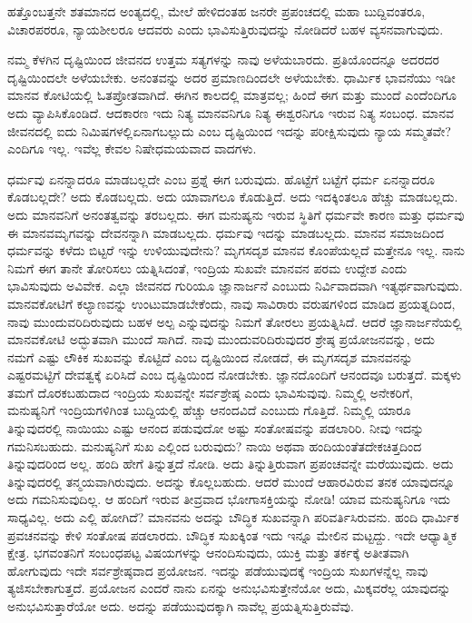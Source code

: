 ಹತ್ತೊಂಬತ್ತನೇ ಶತಮಾನದ ಅಂತ್ಯದಲ್ಲಿ, ಮೇಲೆ ಹೇಳಿದಂತಹ ಜನರೇ ಪ್ರಪಂಚದಲ್ಲಿ ಮಹಾ ಬುದ್ದಿವಂತರೂ, ವಿಚಾರಪರರೂ, ನ್ಯಾಯಶೀಲರೂ ಆದವರು ಎಂದು ಭಾವಿಸುತ್ತಿರುವುದನ್ನು ನೋಡಿದರೆ ಬಹಳ ವ್ಯಸನವಾಗುವುದು.

ನಮ್ಮ ಕೆಳಗಿನ ದೃಷ್ಟಿಯಿಂದ ಜೀವನದ ಉತ್ತಮ ಸತ್ಯಗಳನ್ನು ನಾವು ಅಳೆಯಬಾರದು. ಪ್ರತಿಯೊಂದನ್ನೂ ಅದರದರ ದೃಷ್ಟಿಯಿಂದಲೇ ಅಳೆಯಬೇಕು. ಅನಂತವನ್ನು ಅದರ ಪ್ರಮಾಣದಿಂದಲೇ ಅಳೆಯಬೇಕು. ಧಾರ್ಮಿಕ ಭಾವನೆಯು ಇಡೀ ಮಾನವ ಕೋಟಿಯಲ್ಲಿ ಓತಪ್ರೋತವಾಗಿದೆ. ಈಗಿನ ಕಾಲದಲ್ಲಿ ಮಾತ್ರವಲ್ಲ; ಹಿಂದೆ ಈಗ ಮತ್ತು ಮುಂದೆ ಎಂದೆಂದಿಗೂ ಅದು ವ್ಯಾಪಿಸಿಕೊಂಡಿದೆ. ಆದಕಾರಣ ಇದು ನಿತ್ಯ ಮಾನವನಿಗೂ ನಿತ್ಯ ಈಶ್ವರನಿಗೂ ಇರುವ ನಿತ್ಯ ಸಂಬಂಧ. ಮಾನವ ಜೀವನದಲ್ಲಿ ಐದು ನಿಮಿಷಗಳಲ್ಲಿ\break ಏನಾಗಬಲ್ಲುದು ಎಂಬ ದೃಷ್ಟಿಯಿಂದ ಇದನ್ನು ಪರೀಕ್ಷಿಸುವುದು ನ್ಯಾಯ ಸಮ್ಮತವೇ? ಎಂದಿಗೂ ಇಲ್ಲ. ಇವೆಲ್ಲ ಕೇವಲ ನಿಷೇಧಮಯವಾದ ವಾದಗಳು.

ಧರ್ಮವು ಏನನ್ನಾದರೂ ಮಾಡಬಲ್ಲದೇ ಎಂಬ ಪ್ರಶ್ನೆ ಈಗ ಬರುವುದು. ಹೊಟ್ಟೆಗೆ ಬಟ್ಟೆಗೆ ಧರ್ಮ ಏನನ್ನಾದರೂ ಕೊಡಬಲ್ಲದೇ? ಅದು ಕೊಡಬಲ್ಲದು. ಅದು ಯಾವಾಗಲೂ ಕೊಡುತ್ತಿದೆ. ಅದು ಇದಕ್ಕಿಂತಲೂ ಹೆಚ್ಚು ಮಾಡಬಲ್ಲದು. ಅದು ಮಾನವನಿಗೆ ಅನಂತತ್ವವನ್ನು ತರಬಲ್ಲದು. ಈಗ ಮನುಷ್ಯನು ಇರುವ ಸ್ಥಿತಿಗೆ ಧರ್ಮವೇ ಕಾರಣ ಮತ್ತು ಧರ್ಮವು ಈ ಮಾನವಮೃಗವನ್ನು ದೇವನನ್ನಾಗಿ ಮಾಡಬಲ್ಲದು. ಧರ್ಮವು ಇದನ್ನು ಮಾಡಬಲ್ಲದು. ಮಾನವ ಸಮಾಜದಿಂದ ಧರ್ಮವನ್ನು ಕಳೆದು ಬಿಟ್ಟರೆ ಇನ್ನು ಉಳಿಯುವುದೇನು? ಮೃಗಸದೃಶ ಮಾನವ ಕೊಂಪೆಯಲ್ಲದೆ ಮತ್ತೇನೂ ಇಲ್ಲ. ನಾನು ನಿಮಗೆ ಈಗ ತಾನೇ ತೋರಿಸಲು ಯತ್ನಿಸಿದಂತೆ, ಇಂದ್ರಿಯ ಸುಖವೇ ಮಾನವನ ಪರಮ ಉದ್ದೇಶ ಎಂದು ಭಾವಿಸುವುದು ಅವಿವೇಕ. ಎಲ್ಲಾ ಜೀವನದ ಗುರಿಯೂ ಜ್ಞಾನಾರ್ಜನೆ ಎಂಬುದು ನಿರ್ವಿವಾದವಾಗಿ ಇತ್ಯರ್ಥವಾಗುವುದು. ಮಾನವಕೋಟಿಗೆ ಕಲ್ಯಾಣವನ್ನು ಉಂಟುಮಾಡಬೇಕೆಂದು, ನಾವು ಸಾವಿರಾರು ವರುಷಗಳಿಂದ ಮಾಡಿದ ಪ್ರಯತ್ನದಿಂದ, ನಾವು ಮುಂದುವರಿದಿರುವುದು ಬಹಳ ಅಲ್ಪ ಎನ್ನುವುದನ್ನು ನಿಮಗೆ ತೋರಲು ಪ್ರಯತ್ನಿಸಿದೆ. ಆದರೆ ಜ್ಞಾನಾರ್ಜನೆಯಲ್ಲಿ ಮಾನವಕೋಟಿ ಅದ್ಭುತವಾಗಿ ಮುಂದೆ ಸಾಗಿದೆ. ನಾವು ಮುಂದುವರಿದಿರುವುದರ ಶ್ರೇಷ್ಠ ಪ್ರಯೋಜನವನ್ನು, ಅದು ನಮಗೆ ಎಷ್ಟು ಲೌಕಿಕ ಸುಖವನ್ನು ಕೊಟ್ಟಿದೆ ಎಂಬ ದೃಷ್ಟಿಯಿಂದ ನೋಡದೆ, ಈ ಮೃಗಸದೃಶ ಮಾನವನನ್ನು ಎಷ್ಟರಮಟ್ಟಿಗೆ ದೇವತ್ವಕ್ಕೆ ಏರಿಸಿದೆ ಎಂಬ ದೃಷ್ಟಿಯಿಂದ ನೋಡಬೇಕು. ಜ್ಞಾನದೊಂದಿಗೆ ಆನಂದವೂ ಬರುತ್ತದೆ. ಮಕ್ಕಳು ತಮಗೆ ದೊರಕಬಹುದಾದ ಇಂದ್ರಿಯ ಸುಖವನ್ನೇ ಸರ್ವಶ್ರೇಷ್ಠ ಎಂದು ಭಾವಿಸುವುವು. ನಿಮ್ಮಲ್ಲಿ ಅನೇಕರಿಗೆ, ಮನುಷ್ಯನಿಗೆ ಇಂದ್ರಿಯಗಳಿಗಿಂತ ಬುದ್ದಿಯಲ್ಲಿ ಹೆಚ್ಚು ಆನಂದವಿದೆ ಎಂಬುದು ಗೊತ್ತಿದೆ. ನಿಮ್ಮಲ್ಲಿ ಯಾರೂ ತಿನ್ನುವುದರಲ್ಲಿ ನಾಯಿಯು ಎಷ್ಟು ಆನಂದ ಪಡುವುದೋ ಅಷ್ಟು ಸಂತೋಷವನ್ನು ಪಡಲಾರಿರಿ. ನೀವು ಇದನ್ನು ಗಮನಿಸಬಹುದು. ಮನುಷ್ಯನಿಗೆ ಸುಖ ಎಲ್ಲಿಂದ ಬರುವುದು? ನಾಯಿ ಅಥವಾ ಹಂದಿಯಂತೆ\break ತದೇಕಚಿತ್ತದಿಂದ ತಿನ್ನುವುದರಿಂದ ಅಲ್ಲ. ಹಂದಿ ಹೇಗೆ ತಿನ್ನುತ್ತದೆ ನೋಡಿ. ಅದು ತಿನ್ನುತ್ತಿರುವಾಗ ಪ್ರಪಂಚವನ್ನೇ ಮರೆಯುವುದು. ಅದು ತಿನ್ನುವುದರಲ್ಲಿ ತನ್ಮಯವಾಗಿರುವುದು. ಅದನ್ನು ಕೊಲ್ಲಬಹುದು. ಆದರೆ ಮುಂದೆ ಆಹಾರವಿರುವ ತನಕ ಯಾವುದನ್ನೂ ಅದು ಗಮನಿಸುವುದಿಲ್ಲ. ಆ ಹಂದಿಗೆ ಇರುವ ತೀವ್ರವಾದ ಭೋಗಾಸಕ್ತಿಯನ್ನು ನೋಡಿ! ಯಾವ ಮನುಷ್ಯನಿಗೂ ಇದು ಸಾಧ್ಯವಿಲ್ಲ. ಅದು ಎಲ್ಲಿ ಹೋಗಿದೆ? ಮಾನವನು ಅದನ್ನು ಬೌದ್ಧಿಕ ಸುಖವನ್ನಾಗಿ ಪರಿವರ್ತಿಸಿರುವನು. ಹಂದಿ ಧಾರ್ಮಿಕ ಪ್ರವಚನವನ್ನು ಕೇಳಿ ಸಂತೋಷ ಪಡಲಾರದು. ಬೌದ್ಧಿಕ ಸುಖಕ್ಕಿಂತ ಇದು ಇನ್ನೂ ಮೇಲಿನ ಮಟ್ಟದ್ದು. ಇದೇ ಆಧ್ಯಾತ್ಮಿಕ ಕ್ಷೇತ್ರ. ಭಗವಂತನಿಗೆ ಸಂಬಂಧಪಟ್ಟ ವಿಷಯಗಳನ್ನು ಆನಂದಿಸುವುದು, ಯುಕ್ತಿ ಮತ್ತು ತರ್ಕಕ್ಕೆ ಅತೀತವಾಗಿ ಹೋಗುವುದು ಇದೇ ಸರ್ವಶ್ರೇಷ್ಠವಾದ ಪ್ರಯೋಜನ. ಇದನ್ನು ಪಡೆಯುವುದಕ್ಕೆ ಇಂದ್ರಿಯ ಸುಖಗಳನ್ನೆಲ್ಲ ನಾವು ತ್ಯಜಿಸಬೇಕಾಗುತ್ತದೆ. ಪ್ರಯೋಜನ ಎಂದರೆ ನಾನು ಏನನ್ನು ಅನುಭವಿಸುತ್ತೇನೆಯೋ ಅದು, ಮಿಕ್ಕವರೆಲ್ಲ ಯಾವುದನ್ನು ಅನುಭವಿಸುತ್ತಾರೆಯೋ ಅದು. ಅದನ್ನು ಪಡೆಯುವುದಕ್ಕಾಗಿ ನಾವೆಲ್ಲ ಪ್ರಯತ್ನಿಸುತ್ತಿರುವೆವು.

